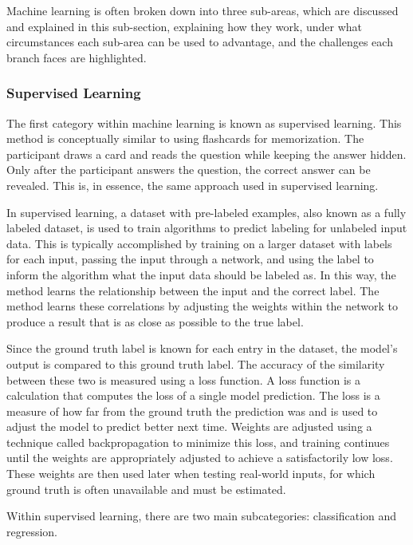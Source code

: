     Machine learning is often broken down into three sub-areas, which are discussed and explained in this sub-section, explaining how they work, under what circumstances each sub-area can be used to advantage, and the challenges each branch faces are highlighted.

        \subsubsection{Supervised Learning}

        The first category within machine learning is known as supervised learning. This method is conceptually similar to using flashcards for memorization.
        The participant draws a card and reads the question while keeping the answer hidden. Only after the participant answers the question, the correct answer can be revealed. This is, in essence, the same approach used in supervised learning.
        
        
        In supervised learning, a dataset with pre-labeled examples, also known as a fully labeled dataset, is used to train algorithms to predict labeling for unlabeled input data. This is typically accomplished by training on a larger dataset with labels for each input, passing the input through a network, and using the label to inform the algorithm what the input data should be labeled as. In this way, the method learns the relationship between the input and the correct label. The method learns these correlations by adjusting the weights within the network to produce a result that is as close as possible to the true label.
        
        Since the ground truth label is known for each entry in the dataset, the model's output is compared to this ground truth label. The accuracy of the similarity between these two is measured using a loss function. 
        A loss function is a calculation that computes the loss of a single model prediction. The loss is a measure of how far from the ground truth the prediction was and is used to adjust the model to predict better next time. 
        Weights are adjusted using a technique called backpropagation to minimize this loss, and training continues until the weights are appropriately adjusted to achieve a satisfactorily low loss. These weights are then used later when testing real-world inputs, for which ground truth is often unavailable and must be estimated.
        
        Within supervised learning, there are two main subcategories: classification and regression. 
        
